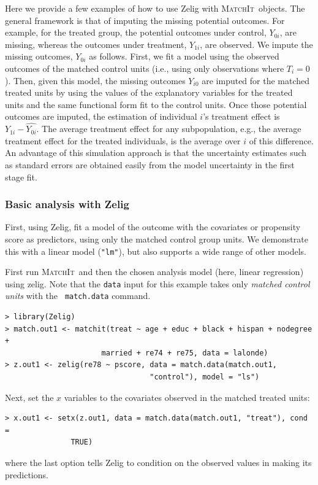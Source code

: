 \documentclass[oneside,letterpaper,titlepage]{article}
\newcommand{\hlink}{\htmladdnormallink}
\newcommand{\MatchIt}{\textsc{MatchIt}}
\begin{document}
Here we provide a few examples of how to use Zelig with \MatchIt\ 
objects.  The general framework is that of imputing the missing
potential outcomes.  For example, for the treated group, the potential
outcomes under control, $Y_{0i}$, are missing, whereas the outcomes
under treatment, $Y_{1i}$, are observed.  We impute the missing
outcomes, $Y_{0i}$ as follows.  First, we fit a model using the
observed outcomes of the matched control units (i.e., using only
observations where $T_i=0$).  Then, given this model, the missing
outcomes $Y_{i0}$ are imputed for the matched treated units by using
the values of the explanatory variables for the treated units and the
same functional form fit to the control units.  Once those potential
outcomes are imputed, the estimation of individual $i$'s treatment
effect is $Y_{1i}-\widehat{Y_{0i}}$.  The average treatment effect for
any subpopulation, e.g., the average treatment effect for the treated
individuals, is the average over $i$ of this difference. An advantage
of this simulation approach is that the uncertainty estimates such as
standard errors are obtained easily from the model uncertainty in the
first stage fit.

\subsubsection{Basic analysis with Zelig}

First, using Zelig, fit a model of the outcome with the covariates or
propensity score as predictors, using only the matched control group
units.  We demonstrate this with a linear model ({\tt "lm"}), but
\hlink{Zelig}{http://gking.harvard.edu/zelig} also supports a wide
range of other models.

First run \MatchIt\ and then the chosen analysis model (here, linear
regression) using zelig.  Note that the {\tt data} input for this
example takes only \emph{matched control units} with the {\tt
  match.data} command.
\begin{verbatim}
> library(Zelig)
> match.out1 <- matchit(treat ~ age + educ + black + hispan + nodegree +
                      married + re74 + re75, data = lalonde)
> z.out1 <- zelig(re78 ~ pscore, data = match.data(match.out1,
                                 "control"), model = "ls")
\end{verbatim}
Next, set the $x$ variables to the covariates observed in the matched
treated units:
\begin{verbatim}
> x.out1 <- setx(z.out1, data = match.data(match.out1, "treat"), cond =
               TRUE)
\end{verbatim}
where the last option tells Zelig to condition on the observed values
in making its predictions.
\end{document}
